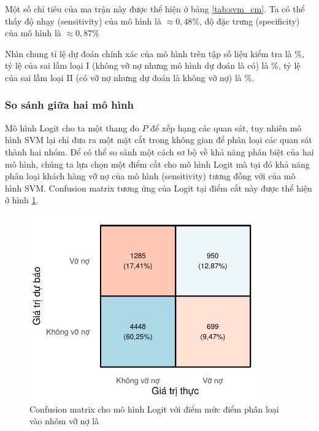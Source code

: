 \documentclass[a4paper]{report}\usepackage[]{graphicx}\usepackage[]{color}
\newenvironment{knitrout}{}{} %
\begin{document}
Một số chỉ tiêu của ma trận này được thể hiện ở bảng \ref{tab:svm_cm}. Ta có thể thấy độ nhạy (sensitivity) của mô hình là $\approx 0,48 \%$, độ đặc trưng (specificity) của mô hình là $\approx 0,87 \%$


Nhìn chung tỉ lệ dự đoán chính xác của mô hình trên tập số liệu kiểm tra là \%, tỷ lệ của sai lầm loại I (không vỡ nợ nhưng mô hình dự đoán là có) là \%, tỷ lệ của sai lầm loại II (có vỡ nợ nhưng dự đoán là không vỡ nợ) là \%.



\subsubsection{So sánh giữa hai mô hình}

Mô hình Logit cho ta một thang đo $P$ để xếp hạng các quan sát, tuy nhiên mô hình SVM lại chỉ đưa ra một mặt cắt trong không gian để phân loại các quan sát thành hai nhóm. Để có thể so sánh một cách sơ bộ về khả năng phân biệt của hai mô hình, chúng ta lựa chọn một điểm cắt cho mô hình Logit mà tại đó khả năng phân loại khách hàng vỡ nợ của mô hình (sensitivity) tương đồng với của mô hình SVM. Confusion matrix tương ứng của Logit tại điểm cắt này được thể hiện ở hình \ref{fig:lasso_confusion_mat}.




\begin{figure}[h]
\centering
\capstart
\begin{knitrout}\small
{}\color{fgcolor}
\includegraphics[width=10cm]{Figures/lasso_confusion_mat-1} 

\end{knitrout}
\caption[Confusion matrix cho mô hình Logit]{Confusion matrix cho mô hình Logit với điểm mức điểm phân loại vào nhóm vỡ nợ là }
\label{fig:lasso_confusion_mat}
\end{figure}
\end{document}
